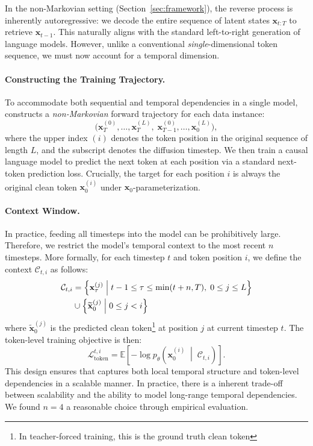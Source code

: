 In the non-Markovian setting (Section~\ref{sec:framework}), the reverse process is inherently autoregressive: we decode the entire sequence of latent states \(\mathbf{x}_{t:T}\) to retrieve \(\mathbf{x}_{t-1}\). This naturally aligns with the standard left-to-right generation of language models. However, unlike a conventional \textit{single}-dimensional token sequence, we must now account for a {temporal} dimension.

\paragraph{Constructing the Training Trajectory.} 
To accommodate both sequential and temporal dependencies in a single model, \method{} constructs a \textit{non-Markovian} forward trajectory for each data instance:
\begin{equation*}
    \bigl(\mathbf{x}_T^{(0)}, \ldots, \mathbf{x}_T^{(L)},\; \mathbf{x}_{T-1}^{(0)}, \ldots, \mathbf{x}_{0}^{(L)}\bigr),
\end{equation*}
where the upper index \((i)\) denotes the token position in the original sequence of length \(L\), and the subscript denotes the diffusion timestep. We then train a causal language model to predict {the next token} at each position via a standard next-token prediction loss. Crucially, the target for each position \(i\) is always the original clean token \(\mathbf{x}_0^{(i)}\) under \(\textbf{x}_0\)-parameterization.

\paragraph{Context Window.}
In practice, feeding all timesteps into the model can be prohibitively large. Therefore, we restrict the model’s temporal context to the most recent \(n\) timesteps. More formally, for each timestep \(t\) and token position \(i\), we define the context \(\mathcal{C}_{t,i}\) as follows:
\begin{align}
    \mathcal{C}_{t,i} &= 
    \left\{ \mathbf{x}_\tau^{(j)} \;\middle|\; t-1 \leq \tau \leq \min(t+n, T),\; 0 \leq j \leq L \right\} \notag \\
    &\cup 
    \left\{ \widetilde{\mathbf{x}}_0^{(j)} \;\middle|\; 0 \leq j < i \right\}
\end{align}
where \(\widetilde{\mathbf{x}}_0^{(j)}\) is the predicted clean token\footnote{In teacher-forced training, this is the ground truth clean token} at position \(j\) at current timestep \(t\). The token-level training objective is then:
\begin{equation}
    \mathcal{L}^{t, i}_{\text{token}} = \mathbb{E}\left[ -\log p_\theta\left( \mathbf{x}_0^{(i)} \;\middle|\; \mathcal{C}_{t,i} \right) \right].
\end{equation}
This design ensures that \method{} captures both local temporal structure and token-level dependencies in a scalable manner.
In practice, there is a inherent trade-off between scalability and the ability to model long-range temporal dependencies. We found \(n=4\) a reasonable choice through empirical evaluation.


